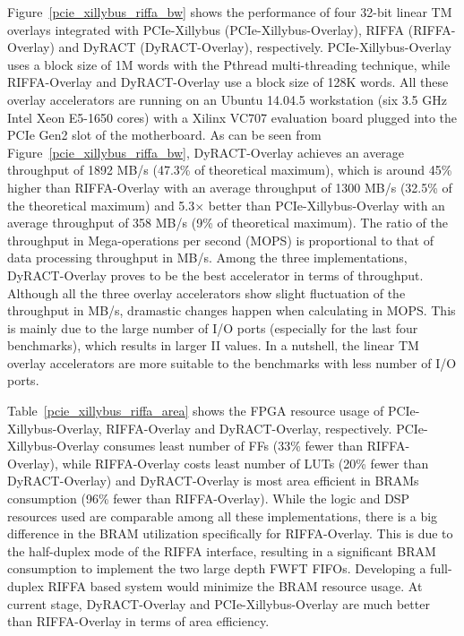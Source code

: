 Figure~\ref{pcie_xillybus_riffa_bw} shows the performance of four 32-bit linear TM overlays integrated with PCIe-Xillybus (PCIe-Xillybus-Overlay), RIFFA (RIFFA-Overlay) and DyRACT (DyRACT-Overlay), respectively. 
PCIe-Xillybus-Overlay uses a block size of 1M words with the Pthread multi-threading technique, while RIFFA-Overlay and DyRACT-Overlay use a block size of 128K words. 
All these overlay accelerators are running on an Ubuntu 14.04.5 workstation (six 3.5 GHz Intel Xeon E5-1650 cores) with a Xilinx VC707 evaluation board plugged into the PCIe Gen2 slot of the motherboard. 
As can be seen from Figure~\ref{pcie_xillybus_riffa_bw}, DyRACT-Overlay achieves an average throughput of 1892 MB/s (47.3\% of theoretical maximum), which is around 45\% higher than RIFFA-Overlay with an average throughput of 1300 MB/s (32.5\% of the theoretical maximum) and 5.3$\times$ better than PCIe-Xillybus-Overlay with an average throughput of 358 MB/s (9\% of theoretical maximum). 
The ratio of the throughput in Mega-operations per second (MOPS) is proportional to that of data processing throughput in MB/s. 
Among the three implementations, DyRACT-Overlay proves to be the best accelerator in terms of throughput. 
Although all the three overlay accelerators show slight fluctuation of the throughput in MB/s, dramastic changes happen when calculating in MOPS. 
This is mainly due to the large number of I/O ports (especially for the last four benchmarks), which results in larger II values. 
In a nutshell, the linear TM overlay accelerators are more suitable to the benchmarks with less number of I/O ports. 



Table~\ref{pcie_xillybus_riffa_area} shows the FPGA resource usage of PCIe-Xillybus-Overlay, RIFFA-Overlay and DyRACT-Overlay, respectively. 
PCIe-Xillybus-Overlay consumes least number of FFs (33\% fewer than RIFFA-Overlay), while RIFFA-Overlay costs least number of LUTs (20\% fewer than DyRACT-Overlay) and DyRACT-Overlay is most area efficient in BRAMs consumption (96\% fewer than RIFFA-Overlay). 
While the logic and DSP resources used are comparable among all these implementations, there is a big difference in the BRAM utilization specifically for RIFFA-Overlay. 
This is due to the half-duplex mode of the RIFFA interface, resulting in a significant BRAM consumption to implement the two large depth FWFT FIFOs. 
Developing a full-duplex RIFFA based system would minimize the BRAM resource usage. 
At current stage, DyRACT-Overlay and PCIe-Xillybus-Overlay are much better than RIFFA-Overlay in terms of area efficiency. 
 
